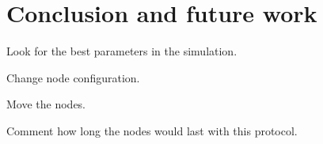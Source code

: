 \chapter{Conclusion and future work}
\label{chap:conclusionsandfuture}

Look for the best parameters in the simulation.

Change node configuration.

Move the nodes.

Comment how long the nodes would last with this protocol.